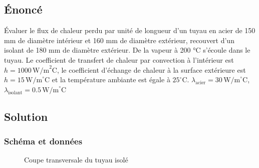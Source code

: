 \documentclass[12pt,a4paper]{article}
\begin{document}
\subsection*{Énoncé}
Évaluer le flux de chaleur perdu par unité de longueur d'un tuyau en acier de 150 mm de diamètre intérieur et 160 mm de diamètre extérieur, recouvert d'un isolant de 180 mm de diamètre extérieur. De la vapeur à 200 °C s'écoule dans le tuyau. Le coefficient de transfert de chaleur par convection à l'intérieur est \( h = 1000 \, \text{W/m}^2\text{C} \), le coefficient d'échange de chaleur à la surface extérieure est \( h = 15 \, \text{W/m}^\circ\text{C} \) et la température ambiante est égale à \( 25^\circ\text{C} \). \( \lambda_{\text{acier}} = 30 \, \text{W/m}^\circ\text{C} \), \( \lambda_{\text{isolant}} = 0.5 \, \text{W/m}^\circ\text{C} \)

\subsection*{Solution}

\subsubsection*{Schéma et données}
\begin{figure}[H]
\centering
{}
\caption{Coupe transversale du tuyau isolé}
\end{figure}
\end{document}
